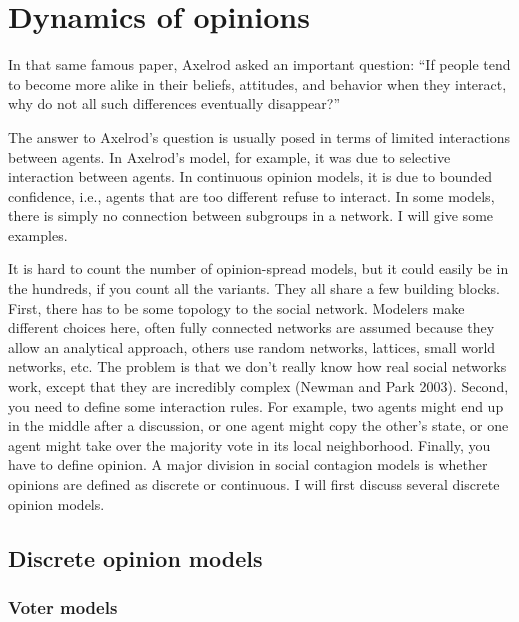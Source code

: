 \documentclass[
  a4paper,
  DIV=11,
  numbers=noendperiod]{scrreprt}
\begin{document}
\hypertarget{sec-Dynamics-of-opinions}{%
\section{Dynamics of opinions}\label{sec-Dynamics-of-opinions}}

In that same famous paper, Axelrod asked an important question: ``If
people tend to become more alike in their beliefs, attitudes, and
behavior when they interact, why do not all such differences eventually
disappear?''

The answer to Axelrod's question is usually posed in terms of limited
interactions between agents. In Axelrod's model, for example, it was due
to selective interaction between agents. In continuous opinion models,
it is due to bounded confidence, i.e., agents that are too different
refuse to interact. In some models, there is simply no connection
between subgroups in a network. I will give some examples.

It is hard to count the number of opinion-spread models, but it could
easily be in the hundreds, if you count all the variants. They all share
a few building blocks. First, there has to be some topology to the
social network. Modelers make different choices here, often fully
connected networks are assumed because they allow an analytical
approach, others use random networks, lattices, small world networks,
etc. The problem is that we don't really know how real social networks
work, except that they are incredibly complex (Newman and Park 2003).
Second, you need to define some interaction rules. For example, two
agents might end up in the middle after a discussion, or one agent might
copy the other's state, or one agent might take over the majority vote
in its local neighborhood. Finally, you have to define opinion. A major
division in social contagion models is whether opinions are defined as
discrete or continuous. I will first discuss several discrete opinion
models.

\hypertarget{sec-Discrete-opinion-models}{%
\subsection{Discrete opinion models}\label{sec-Discrete-opinion-models}}

\hypertarget{sec-Voter-models}{%
\subsubsection{Voter models}\label{sec-Voter-models}}
\end{document}
